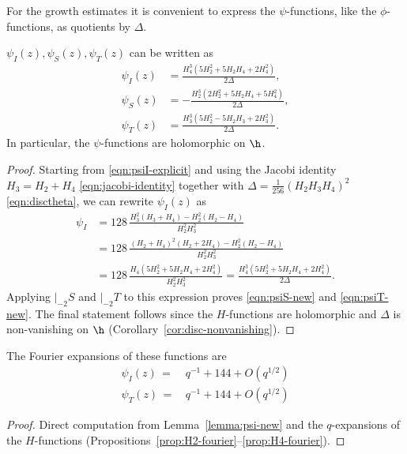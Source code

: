 For the growth estimates it is convenient to express the $\psi$-functions, like the $\phi$-functions, as quotients by $\Delta$.

\begin{lemma}\label{lemma:psi-new}
    $\psi_I(z), \psi_S(z), \psi_T(z)$ can be written as
    \begin{align}
        \psi_I(z) &= \frac{H_4^3 (5 H_2^2 + 5 H_2 H_4 + 2 H_4^2)}{2\Delta}, \label{eqn:psiI-new} \\
        \psi_S(z) &= -\frac{H_2^3 (2 H_2^2 + 5 H_2 H_4 + 5 H_4^2)}{2 \Delta}, \label{eqn:psiS-new} \\
        \psi_T(z) &= \frac{H_3^3 (5 H_2^2 - 5 H_2 H_3 + 2 H_3^2)}{2 \Delta}.\label{eqn:psiT-new}
    \end{align}
    In particular, the $\psi$-functions are holomorphic on $\h$.
\end{lemma}
\begin{proof}
Starting from \eqref{eqn:psiI-explicit} and using the Jacobi identity $H_3 = H_2 + H_4$ \eqref{eqn:jacobi-identity} together with $\Delta = \frac{1}{256}(H_2 H_3 H_4)^2$ \eqref{eqn:disctheta}, we can rewrite $\psi_I(z)$ as
\begin{align}
    \psi_I &= 128\, \frac{H_3^2 (H_3 + H_4) - H_2^2 (H_2 - H_4)}{H_2^2 H_3^2} \\
    &= 128\, \frac{(H_2 + H_4)^2 (H_2 + 2 H_4) - H_2^2 (H_2 - H_4)}{H_2^2 H_3^2} \\
    &= 128\, \frac{H_4(5 H_2^2 + 5 H_2 H_4 + 2 H_4^2)}{ H_2^2 H_3^2}
    = \frac{H_4^3 (5 H_2^2 + 5 H_2 H_4 + 2 H_4^2)}{2\Delta}.
\end{align}
Applying $|_{-2}S$ and $|_{-2}T$ to this expression proves \eqref{eqn:psiS-new} and \eqref{eqn:psiT-new}.
The final statement follows since the $H$-functions are holomorphic and $\Delta$ is non-vanishing on $\h$ (Corollary~\ref{cor:disc-nonvanishing}).
\end{proof}


\begin{lemma}\label{lemma:psiI-psiT-psiS-fourier}
The Fourier expansions of these functions are
\begin{align}
    \psi_I(z)\,=\,&q^{-1} + 144 + O(q^{1/2}) \label{eqn: psi fourier I}\\
    \psi_T(z)\,=\,&q^{-1} + 144 + O(q^{1/2}) \label{eqn: psi fourier T}
\end{align}
\end{lemma}
\begin{proof}
Direct computation from Lemma~\ref{lemma:psi-new} and the $q$-expansions of the $H$-functions (Propositions~\ref{prop:H2-fourier}--\ref{prop:H4-fourier}).
\end{proof}

